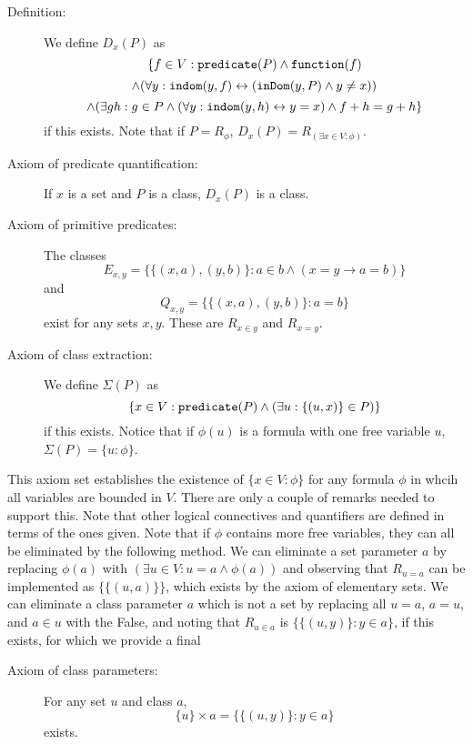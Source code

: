 \documentclass[12pt]{article}
\begin{document}
\begin{description}
\item[Definition:]  We define $D_x(P)$ as $$\{f \in V:{\tt predicate}(P) \wedge {\tt function}(f) $$ $$\wedge (\forall y:{\tt indom}(y,f)\leftrightarrow ({\tt inDom}(y,P) \wedge y \neq x)) $$ $$\wedge (\exists gh:g \in P \wedge (\forall y:{\tt indom}(y,h)\leftrightarrow y=x) \wedge f+h=g+h\}$$ if this exists.  Note that if $P = R_{\phi}$, $D_x(P) = R_{(\exists x \in V:\phi)}$.

\item[Axiom of predicate quantification:]  If $x$ is a set and $P$ is a class, $D_x(P)$ is a class.

\item[Axiom of primitive predicates:]  The classes $$E_{x,y}=\{\{(x,a),(y,b)\}:a \in b \wedge (x=y \rightarrow a=b)\}$$ and $$Q_{x,y}=\{\{(x,a),(y,b)\}:a=b\}$$ exist
 for any sets $x,y$.  These are $R_{x \in y}$ and $R_{x=y}$.

\item[Axiom of class extraction:]  We define $\Sigma(P)$ as $$\{x \in V:{\tt predicate}(P) \wedge (\exists u:\{(u,x)\}\in P)\}$$ if this exists.  Notice that if $\phi(u)$ is a formula with one free variable $u$, $\Sigma(P) = \{u:\phi\}$.

\end{description}

This axiom set establishes the existence of $\{x \in V:\phi\}$ for any formula $\phi$ in whcih all variables are bounded in $V$.
There are only a couple of remarks needed to support this.  Note that other logical connectives and quantifiers are defined in terms of the ones given.
Note that if $\phi$ contains more free variables, they can all be eliminated by the following method.  We can eliminate a set parameter $a$ by
replacing $\phi(a)$ with $(\exists u\in V:u=a \wedge \phi(a))$ and observing that $R_{u=a}$ can be implemented as
$\{\{(u,a)\}\}$, which exists by the axiom of elementary sets.  We can eliminate a class parameter $a$ which is not a set by replacing all $u=a$, $a=u$,  and $a \in u$ with the False, and noting that $R_{u \in a}$ is $\{\{(u,y)\}:y\in a\}$, if this exists, for which we provide a final

\begin{description}

\item[Axiom of class parameters:]  For any set $u$ and class $a$, $$\{u\} \times a = \{\{(u,y)\}:y\in a\}$$ exists.

\end{description}
\end{document}
